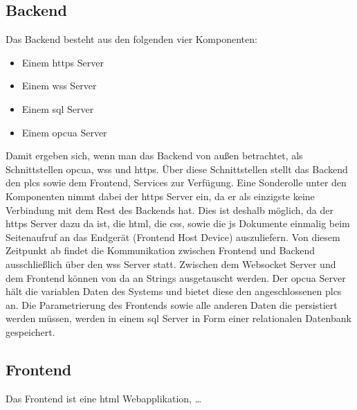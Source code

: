 \subsection{Backend}\label{subsec:archBackend}
Das Backend besteht aus den folgenden vier Komponenten:
 \begin{itemize}
  \item Einem \ac{https} Server
  \item Einem \ac{wss} Server 
  \item Einem \ac{sql} Server
  \item Einem \ac{opcua} Server 
\end{itemize}
Damit ergeben sich, wenn man das Backend von außen betrachtet, als Schnittstellen \ac{opcua}, \ac{wss} und \ac{https}.
Über diese Schnittstellen stellt das Backend den \acp{plc} sowie dem Frontend, Services zur Verfügung.
Eine Sonderolle unter den Komponenten nimmt dabei der \ac{https} Server ein, 
da er als einzigste keine Verbindung mit dem Rest des Backends hat.
Dies ist deshalb möglich, da der \ac{https} Server dazu da ist, die \ac{html}, die \ac{css}, sowie die \ac{js} Dokumente 
einmalig beim Seitenaufruf an das Endgerät (Frontend Host Device) auszuliefern.
Von diesem Zeitpunkt ab findet die Kommunikation zwischen Frontend und Backend ausschließlich über den \ac{wss} Server statt.
Zwischen dem Websocket Server und dem Frontend können von da an Strings ausgetauscht werden.
Der \ac{opcua} Server hält die variablen Daten des Systems und bietet diese den angeschlossenen \acp{plc} an.
Die Parametrierung des Frontends sowie alle anderen Daten die persistiert werden müssen, 
werden in einem \ac{sql} Server in Form einer relationalen Datenbank gespeichert.

\subsection{Frontend}\label{subsec:archFrontend}
Das Frontend ist eine \ac{html} Webapplikation,
\dots

